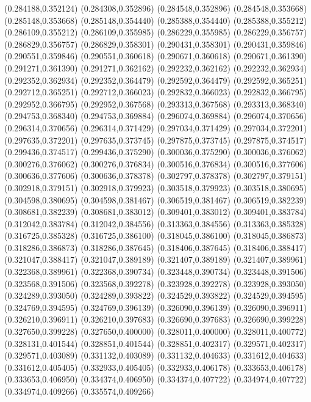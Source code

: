 (0.284188,0.352124)
(0.284308,0.352896)
(0.284548,0.352896)
(0.284548,0.353668)
(0.285148,0.353668)
(0.285148,0.354440)
(0.285388,0.354440)
(0.285388,0.355212)
(0.286109,0.355212)
(0.286109,0.355985)
(0.286229,0.355985)
(0.286229,0.356757)
(0.286829,0.356757)
(0.286829,0.358301)
(0.290431,0.358301)
(0.290431,0.359846)
(0.290551,0.359846)
(0.290551,0.360618)
(0.290671,0.360618)
(0.290671,0.361390)
(0.291271,0.361390)
(0.291271,0.362162)
(0.292232,0.362162)
(0.292232,0.362934)
(0.292352,0.362934)
(0.292352,0.364479)
(0.292592,0.364479)
(0.292592,0.365251)
(0.292712,0.365251)
(0.292712,0.366023)
(0.292832,0.366023)
(0.292832,0.366795)
(0.292952,0.366795)
(0.292952,0.367568)
(0.293313,0.367568)
(0.293313,0.368340)
(0.294753,0.368340)
(0.294753,0.369884)
(0.296074,0.369884)
(0.296074,0.370656)
(0.296314,0.370656)
(0.296314,0.371429)
(0.297034,0.371429)
(0.297034,0.372201)
(0.297635,0.372201)
(0.297635,0.373745)
(0.297875,0.373745)
(0.297875,0.374517)
(0.299436,0.374517)
(0.299436,0.375290)
(0.300036,0.375290)
(0.300036,0.376062)
(0.300276,0.376062)
(0.300276,0.376834)
(0.300516,0.376834)
(0.300516,0.377606)
(0.300636,0.377606)
(0.300636,0.378378)
(0.302797,0.378378)
(0.302797,0.379151)
(0.302918,0.379151)
(0.302918,0.379923)
(0.303518,0.379923)
(0.303518,0.380695)
(0.304598,0.380695)
(0.304598,0.381467)
(0.306519,0.381467)
(0.306519,0.382239)
(0.308681,0.382239)
(0.308681,0.383012)
(0.309401,0.383012)
(0.309401,0.383784)
(0.312042,0.383784)
(0.312042,0.384556)
(0.313363,0.384556)
(0.313363,0.385328)
(0.316725,0.385328)
(0.316725,0.386100)
(0.318045,0.386100)
(0.318045,0.386873)
(0.318286,0.386873)
(0.318286,0.387645)
(0.318406,0.387645)
(0.318406,0.388417)
(0.321047,0.388417)
(0.321047,0.389189)
(0.321407,0.389189)
(0.321407,0.389961)
(0.322368,0.389961)
(0.322368,0.390734)
(0.323448,0.390734)
(0.323448,0.391506)
(0.323568,0.391506)
(0.323568,0.392278)
(0.323928,0.392278)
(0.323928,0.393050)
(0.324289,0.393050)
(0.324289,0.393822)
(0.324529,0.393822)
(0.324529,0.394595)
(0.324769,0.394595)
(0.324769,0.396139)
(0.326090,0.396139)
(0.326090,0.396911)
(0.326210,0.396911)
(0.326210,0.397683)
(0.326690,0.397683)
(0.326690,0.399228)
(0.327650,0.399228)
(0.327650,0.400000)
(0.328011,0.400000)
(0.328011,0.400772)
(0.328131,0.401544)
(0.328851,0.401544)
(0.328851,0.402317)
(0.329571,0.402317)
(0.329571,0.403089)
(0.331132,0.403089)
(0.331132,0.404633)
(0.331612,0.404633)
(0.331612,0.405405)
(0.332933,0.405405)
(0.332933,0.406178)
(0.333653,0.406178)
(0.333653,0.406950)
(0.334374,0.406950)
(0.334374,0.407722)
(0.334974,0.407722)
(0.334974,0.409266)
(0.335574,0.409266)
